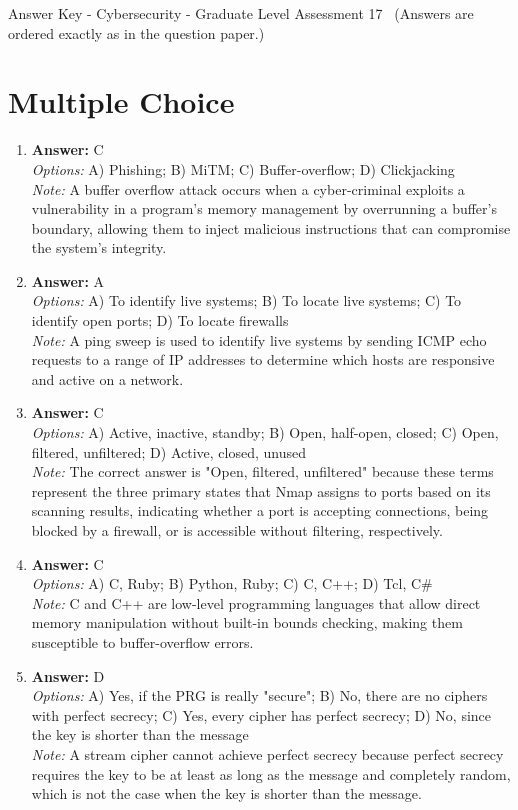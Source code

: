 \documentclass[12pt]{article}
\begin{document}
\begin{center}
Answer Key - Cybersecurity - Graduate Level Assessment 17 \
\small (Answers are ordered exactly as in the question paper.)
\end{center}

\section*{Multiple Choice}
\begin{enumerate}[label=\arabic*.]
\item \textbf{Answer:} C
\\ \textit{Options:} A) Phishing; B) MiTM; C) Buffer-overflow; D) Clickjacking
\\ \textit{Note:} A buffer overflow attack occurs when a cyber-criminal exploits a vulnerability in a program's memory management by overrunning a buffer's boundary, allowing them to inject malicious instructions that can compromise the system's integrity.
\item \textbf{Answer:} A
\\ \textit{Options:} A) To identify live systems; B) To locate live systems; C) To identify open ports; D) To locate firewalls
\\ \textit{Note:} A ping sweep is used to identify live systems by sending ICMP echo requests to a range of IP addresses to determine which hosts are responsive and active on a network.
\item \textbf{Answer:} C
\\ \textit{Options:} A) Active, inactive, standby; B) Open, half-open, closed; C) Open, filtered, unfiltered; D) Active, closed, unused
\\ \textit{Note:} The correct answer is "Open, filtered, unfiltered" because these terms represent the three primary states that Nmap assigns to ports based on its scanning results, indicating whether a port is accepting connections, being blocked by a firewall, or is accessible without filtering, respectively.
\item \textbf{Answer:} C
\\ \textit{Options:} A) C, Ruby; B) Python, Ruby; C) C, C++; D) Tcl, C\#
\\ \textit{Note:} C and C++ are low-level programming languages that allow direct memory manipulation without built-in bounds checking, making them susceptible to buffer-overflow errors.
\item \textbf{Answer:} D
\\ \textit{Options:} A) Yes, if the PRG is really "secure"; B) No, there are no ciphers with perfect secrecy; C) Yes, every cipher has perfect secrecy; D) No, since the key is shorter than the message
\\ \textit{Note:} A stream cipher cannot achieve perfect secrecy because perfect secrecy requires the key to be at least as long as the message and completely random, which is not the case when the key is shorter than the message.
\end{enumerate}
\end{document}
